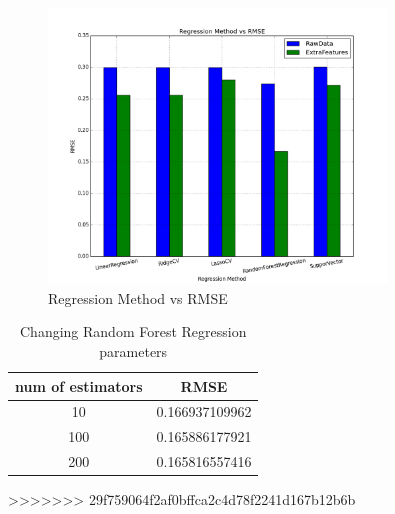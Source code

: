 \documentclass{article}
\begin{document}
\begin{figure}[h]
\centering
\includegraphics[width=0.8\textwidth]{method_selection}
\caption{Regression Method vs RMSE}
\label{fig:method_selection}
\end{figure}

\begin{center}
\begin{table}
\centering
\begin{tabular}{ |c|c| } 
 \hline
num of estimators & RMSE \\
 \hline
 10 &  0.166937109962 \\ 
 100 & 0.165886177921 \\ 
 200 & 0.165816557416 \\ 
 \hline
\end{tabular}
\caption{Changing Random Forest Regression parameters}
\label{table:1}
\end{table}
\end{center}

>>>>>>> 29f759064f2af0bffca2c4d78f2241d167b12b6b
\end{document}

